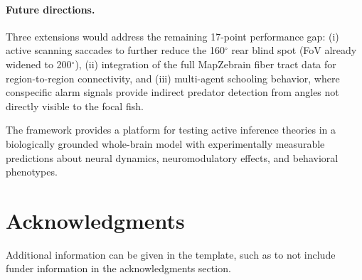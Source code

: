 \documentclass[9pt]{elife}
\begin{document}
\paragraph{Future directions.}
Three extensions would address the remaining 17-point performance gap:
(i) active scanning saccades to further reduce the 160$^\circ$ rear blind spot
(FoV already widened to 200$^\circ$),
(ii) integration of the full MapZebrain fiber tract data for
region-to-region connectivity,
and (iii) multi-agent schooling behavior, where conspecific alarm
signals provide indirect predator detection from angles not
directly visible to the focal fish.

The framework provides a platform for testing active inference theories
in a biologically grounded whole-brain model with experimentally measurable
predictions about neural dynamics, neuromodulatory effects, and behavioral
phenotypes.


\section{Acknowledgments}

Additional information can be given in the template, such as to not include funder information in the acknowledgments section.

\nocite{*} %



\appendix
\end{document}
